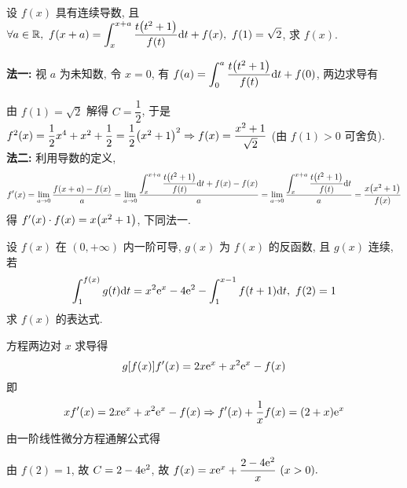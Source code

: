 \begin{example}
    设 $f(x)$ 具有连续导数, 且 $\forall a\in\mathbb{R},~f(x+a)=\displaystyle\int_{x}^{x+a}\dfrac{t\qty(t^2+1)}{f(t)}\dd t+f(x),~f(1)=\sqrt{2}$, 求 $f(x)$.
\end{example}
\begin{solution}
    \textbf{法一: }视 $a$ 为未知数, 令 $x=0$, 有 $\displaystyle f(a)=\int_{0}^{a}\dfrac{t\qty(t^2+1)}{f(t)}\dd t+f(0)$, 两边求导有
    由 $f(1)=\sqrt{2}$ 解得 $C=\dfrac{1}{2}$, 于是 $f^2(x)=\dfrac{1}{2}x^4+x^2+\dfrac{1}{2}=\dfrac{1}{2}\qty(x^2+1)^2\Rightarrow f(x)=\dfrac{x^2+1}{\sqrt{2}}$ (由 $f(1)>0$ 可舍负).\\
    \textbf{法二: }利用导数的定义, 
    $$f'(x)=\lim_{a\to0}\dfrac{f(x+a)-f(x)}{a}=\lim_{a\to0}\dfrac{\displaystyle \int_{x}^{x+a}\dfrac{t\qty(t^2+1)}{f(t)}\dd t+f(x)-f(x)}{a}=\lim_{a\to0}\dfrac{\displaystyle \int_{x}^{x+a}\dfrac{t\qty(t^2+1)}{f(t)}\dd t}{a}=\dfrac{x\qty(x^2+1)}{f(x)}$$
    得 $f'(x)\cdot f(x)=x\qty(x^2+1)$, 下同法一.
\end{solution}

\begin{example}
    设 $f(x)$ 在 $(0,+\infty)$ 内一阶可导, $g(x)$ 为 $f(x)$ 的反函数, 且 $g(x)$ 连续, 若
    $$\int_{1}^{f(x)}g(t)\dd t=x^2\mathrm{e} ^x-4\mathrm{e} ^2-\int_{1}^{x-1}f(t+1)\dd t,~f(2)=1$$
    求 $f(x)$ 的表达式.
\end{example}
\begin{solution}
    方程两边对 $x$ 求导得 $$g[f(x)]f'(x)=2x\mathrm{e} ^x+x^2\mathrm{e} ^x-f(x)$$
    即 $$xf'(x)=2x\mathrm{e} ^x+x^2\mathrm{e} ^x-f(x)\Rightarrow f'(x)+\dfrac{1}{x}f(x)=(2+x)\mathrm{e} ^x$$
    由一阶线性微分方程通解公式得
    由 $f(2)=1$, 故 $C=2-4\mathrm{e} ^2$, 故 $f(x)=x\mathrm{e} ^x+\dfrac{2-4\mathrm{e} ^2}{x}~ (x>0).$
\end{solution}


